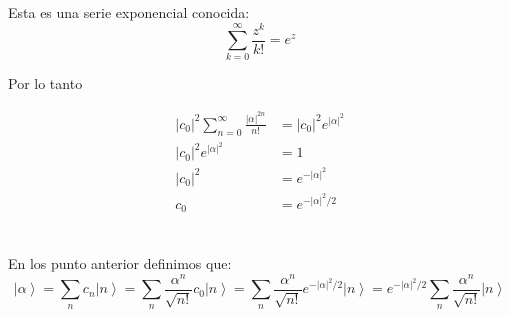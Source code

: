 \documentclass{report}
\begin{document}
Esta es una serie exponencial conocida:
\[
  \sum_{k = 0}^\infty \frac{z^k}{k!} = e^z
\]

Por lo tanto

\begin{align*}
  \left|c_0\right|^2 \sum_{n = 0}^{\infty} \frac{\left|\alpha\right|^{2n}}{n!} &= \left|c_0\right|^2 e^{\left|\alpha\right|^2}\\
  \left|c_0\right|^2 e^{\left|\alpha\right|^2} &= 1\\
  \left|c_0\right|^2 &= e^{-\left|\alpha\right|^2}\\
  c_0 &= e^{-\left|\alpha\right|^2/2}
\end{align*}

\pagebreak

\section{}

En los punto anterior definimos que:
\begin{equation*}
  \left| \alpha \right> = \sum_{n} c_n \left| n \right> = \sum_{n} \frac{\alpha^n}{\sqrt{n!}} c_0 \left| n \right> = \sum_{n} \frac{\alpha^n}{\sqrt{n!}} e^{-\left|\alpha\right|^2/2} \left| n \right> = e^{-\left|\alpha\right|^2/2} \sum_{n} \frac{\alpha^n}{\sqrt{n!}}  \left| n \right>
\end{equation*}
\end{document}
